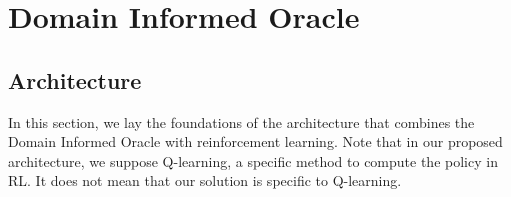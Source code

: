 \section{Domain Informed Oracle} 
\subsection{Architecture}
In this section, we lay the foundations of the architecture that combines the Domain Informed Oracle with 
reinforcement learning. Note that in our proposed architecture, we suppose Q-learning, a specific method to compute the policy in RL. 
It does not mean that our solution is specific to
Q-learning. 

\medskip 


